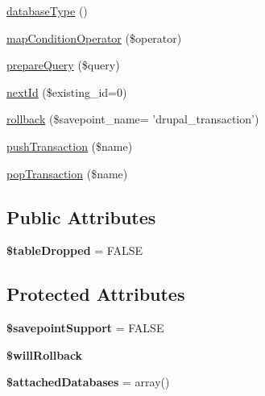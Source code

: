 \begin{DoxyCompactItemize}
\hyperlink{classDatabaseConnection__sqlite_acafbe944024f6bbdf26c11dab3c6b534}{databaseType} ()
\item 
\hyperlink{classDatabaseConnection__sqlite_aed69efc240fdb031430c8afbdb6c3ba9}{mapConditionOperator} (\$operator)
\item 
\hyperlink{classDatabaseConnection__sqlite_aac5845cb92d937ec15f435043d014a8e}{prepareQuery} (\$query)
\item 
\hyperlink{classDatabaseConnection__sqlite_ada0053b7801625663994ae1e0ddaabdf}{nextId} (\$existing\_\-id=0)
\item 
\hyperlink{classDatabaseConnection__sqlite_aa0c95a9076d4aa2d08569d344eeb81de}{rollback} (\$savepoint\_\-name= 'drupal\_\-transaction')
\item 
\hyperlink{classDatabaseConnection__sqlite_a00c6285d1c008b5aa496b046700f15a3}{pushTransaction} (\$name)
\item 
\hyperlink{classDatabaseConnection__sqlite_a92aff36a5e22c5f21258a6a2333121b4}{popTransaction} (\$name)
\end{DoxyCompactItemize}
\subsection*{Public Attributes}
\begin{DoxyCompactItemize}
\item 
\hypertarget{classDatabaseConnection__sqlite_a2078af3a05e3020af797bf60b1d57921}{
{\bfseries \$tableDropped} = FALSE}
\label{classDatabaseConnection__sqlite_a2078af3a05e3020af797bf60b1d57921}

\end{DoxyCompactItemize}
\subsection*{Protected Attributes}
\begin{DoxyCompactItemize}
\item 
\hypertarget{classDatabaseConnection__sqlite_a6f1a51ee1f6a359288b1514ecd5c49d5}{
{\bfseries \$savepointSupport} = FALSE}
\label{classDatabaseConnection__sqlite_a6f1a51ee1f6a359288b1514ecd5c49d5}

\item 
\hypertarget{classDatabaseConnection__sqlite_a878ff1a095bc5eb184e31552098ae8b4}{
{\bfseries \$willRollback}}
\label{classDatabaseConnection__sqlite_a878ff1a095bc5eb184e31552098ae8b4}

\item 
\hypertarget{classDatabaseConnection__sqlite_a48aa109566dc6a97c2794a86f2736329}{
{\bfseries \$attachedDatabases} = array()}
\label{classDatabaseConnection__sqlite_a48aa109566dc6a97c2794a86f2736329}

\end{DoxyCompactItemize}


